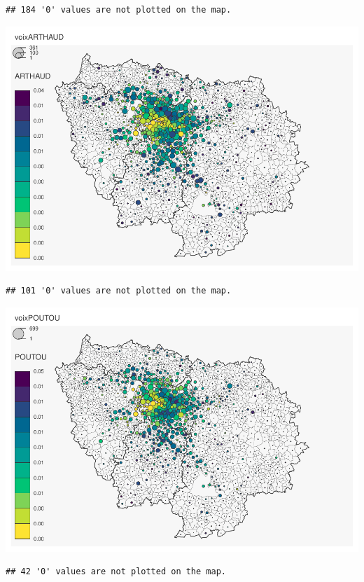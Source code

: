\documentclass[
]{book}
\begin{document}
\begin{verbatim}
## 184 '0' values are not plotted on the map.
\end{verbatim}

\includegraphics{bookdown-demo_files/figure-latex/unnamed-chunk-52-1.pdf}

\begin{verbatim}
## 101 '0' values are not plotted on the map.
\end{verbatim}

\includegraphics{bookdown-demo_files/figure-latex/unnamed-chunk-52-2.pdf}

\begin{verbatim}
## 42 '0' values are not plotted on the map.
\end{verbatim}
\end{document}

